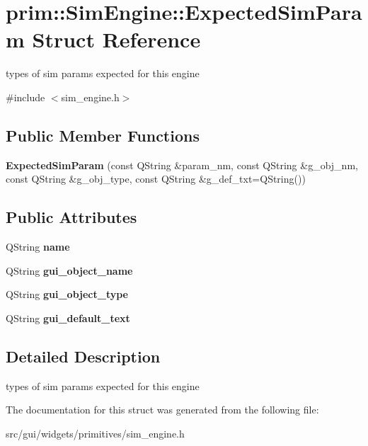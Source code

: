 \hypertarget{structprim_1_1SimEngine_1_1ExpectedSimParam}{}\section{prim\+:\+:Sim\+Engine\+:\+:Expected\+Sim\+Param Struct Reference}
\label{structprim_1_1SimEngine_1_1ExpectedSimParam}


types of sim params expected for this engine  




{\ttfamily \#include $<$sim\+\_\+engine.\+h$>$}

\subsection*{Public Member Functions}
\begin{DoxyCompactItemize}
\item 
{\bfseries Expected\+Sim\+Param} (const Q\+String \&param\+\_\+nm, const Q\+String \&g\+\_\+obj\+\_\+nm, const Q\+String \&g\+\_\+obj\+\_\+type, const Q\+String \&g\+\_\+def\+\_\+txt=Q\+String())\hypertarget{structprim_1_1SimEngine_1_1ExpectedSimParam_a89d4509bd7f5abd86a6bf5b799c7a1b2}{}\label{structprim_1_1SimEngine_1_1ExpectedSimParam_a89d4509bd7f5abd86a6bf5b799c7a1b2}

\end{DoxyCompactItemize}
\subsection*{Public Attributes}
\begin{DoxyCompactItemize}
\item 
Q\+String {\bfseries name}\hypertarget{structprim_1_1SimEngine_1_1ExpectedSimParam_af0bf0e1278ccb3f1eb3601c48fc82a6d}{}\label{structprim_1_1SimEngine_1_1ExpectedSimParam_af0bf0e1278ccb3f1eb3601c48fc82a6d}

\item 
Q\+String {\bfseries gui\+\_\+object\+\_\+name}\hypertarget{structprim_1_1SimEngine_1_1ExpectedSimParam_a431b9baebb27844d4c7ed2c71f61c294}{}\label{structprim_1_1SimEngine_1_1ExpectedSimParam_a431b9baebb27844d4c7ed2c71f61c294}

\item 
Q\+String {\bfseries gui\+\_\+object\+\_\+type}\hypertarget{structprim_1_1SimEngine_1_1ExpectedSimParam_a50d14d3bdb5829ff49d0beef7ea977c1}{}\label{structprim_1_1SimEngine_1_1ExpectedSimParam_a50d14d3bdb5829ff49d0beef7ea977c1}

\item 
Q\+String {\bfseries gui\+\_\+default\+\_\+text}\hypertarget{structprim_1_1SimEngine_1_1ExpectedSimParam_ae7e0551ee8433d287587bbc71a157595}{}\label{structprim_1_1SimEngine_1_1ExpectedSimParam_ae7e0551ee8433d287587bbc71a157595}

\end{DoxyCompactItemize}


\subsection{Detailed Description}
types of sim params expected for this engine 

The documentation for this struct was generated from the following file\+:\begin{DoxyCompactItemize}
\item 
src/gui/widgets/primitives/sim\+\_\+engine.\+h\end{DoxyCompactItemize}
